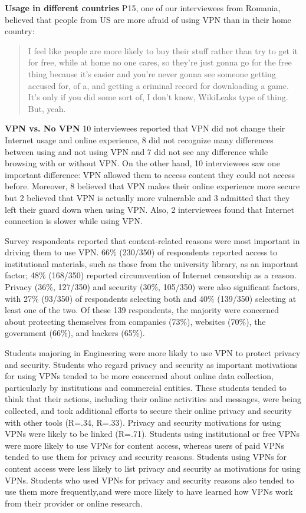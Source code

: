 \textbf{Usage in different countries}
P15, one of our interviewees from Romania, believed that people from US are
more afraid of using VPN than in their home country: \begin{quote}I feel like
people are more likely to buy their stuff rather than try to get it for free,
while at home no one cares, so they're just gonna go for the free thing
because it's easier and you're never gonna see someone getting accused for, of
a, and getting a criminal record for downloading a game. It's only if you did
some sort of, I don't know, WikiLeaks type of thing. But, yeah.\end{quote}

\textbf{VPN vs. No VPN} 10 interviewees reported that VPN did not change their
Internet usage and online experience, 8 did not recognize many differences
between using and not using VPN and 7 did not see any difference while
browsing with or without VPN. On the other hand, 10 interviewees saw one
important difference: VPN allowed them to access content they could not access
before. Moreover, 8 believed that VPN makes their online experience more
secure but 2 believed that VPN is actually more vulnerable and 3 admitted that
they left their guard down when using VPN. Also, 2 interviewees found that
Internet connection is slower while using VPN.

Survey respondents reported that content-related reasons were most important
in driving them to use VPN. 66\% (230/350) of respondents reported access to
institutional materials, such as those from the university library, as an
important factor; 48\% (168/350) reported circumvention of Internet censorship
as a reason. Privacy (36\%, 127/350) and security (30\%, 105/350) were also
significant factors, with 27\% (93/350) of respondents selecting both and 40\%
(139/350) selecting at least one of the two. Of these 139 respondents, the
majority were concerned about protecting themselves from companies (73\%),
websites (70\%), the government (66\%), and hackers (65\%).

Students majoring in Engineering were more likely to use VPN to protect
privacy and security. Students who regard privacy and security as important
motivations for using VPNs tended to be more concerned about online data
collection, particularly by institutions and commercial entities. These
students tended to think that their actions, including their online activities
and messages, were being collected, and took additional efforts to secure
their online privacy and security with other tools (R=.34, R=.33). Privacy and
security motivations for using VPNs were likely to be linked (R=.71). Students
using institutional or free VPNs were more likely to use VPNs for content
access, whereas users of paid VPNs tended to use them for privacy and security
reasons. Students using VPNs for content access were less likely to list
privacy and security as motivations for using VPNs. Students who used VPNs for
privacy and security reasons also tended to use them more frequently,and were
more likely to have learned how VPNs work from their provider or online
research. 

